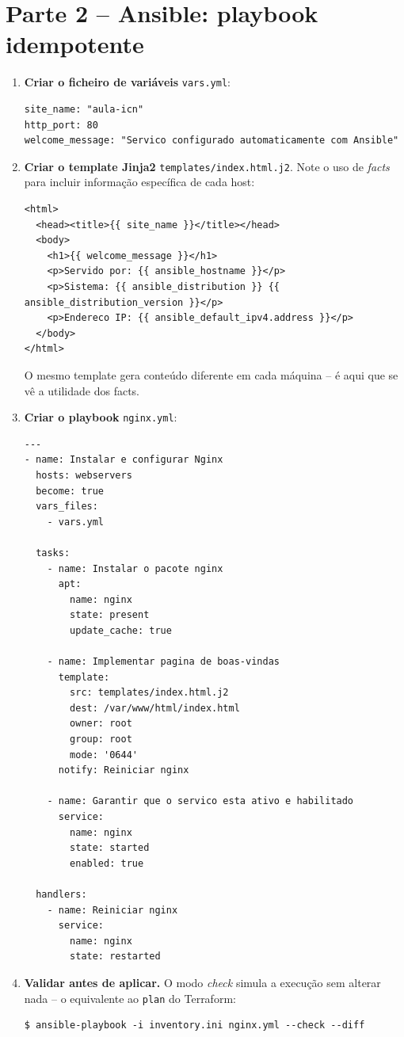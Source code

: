 \documentclass[11pt,a4paper]{article}
\begin{document}
\section{Parte 2 -- Ansible: playbook idempotente}
\begin{enumerate}[label=\arabic*.,resume]

  \item \textbf{Criar o ficheiro de variáveis} \texttt{vars.yml}:
\begin{lstlisting}
site_name: "aula-icn"
http_port: 80
welcome_message: "Servico configurado automaticamente com Ansible"
\end{lstlisting}

  \item \textbf{Criar o template Jinja2} \texttt{templates/index.html.j2}. Note o uso de \emph{facts} para incluir informação específica de cada host:
\begin{lstlisting}
<html>
  <head><title>{{ site_name }}</title></head>
  <body>
    <h1>{{ welcome_message }}</h1>
    <p>Servido por: {{ ansible_hostname }}</p>
    <p>Sistema: {{ ansible_distribution }} {{ ansible_distribution_version }}</p>
    <p>Endereco IP: {{ ansible_default_ipv4.address }}</p>
  </body>
</html>
\end{lstlisting}
  O mesmo template gera conteúdo diferente em cada máquina -- é aqui que se vê a utilidade dos facts.

  \item \textbf{Criar o playbook} \texttt{nginx.yml}:
\begin{lstlisting}
---
- name: Instalar e configurar Nginx
  hosts: webservers
  become: true
  vars_files:
    - vars.yml

  tasks:
    - name: Instalar o pacote nginx
      apt:
        name: nginx
        state: present
        update_cache: true

    - name: Implementar pagina de boas-vindas
      template:
        src: templates/index.html.j2
        dest: /var/www/html/index.html
        owner: root
        group: root
        mode: '0644'
      notify: Reiniciar nginx

    - name: Garantir que o servico esta ativo e habilitado
      service:
        name: nginx
        state: started
        enabled: true

  handlers:
    - name: Reiniciar nginx
      service:
        name: nginx
        state: restarted
\end{lstlisting}

  \item \textbf{Validar antes de aplicar.} O modo \emph{check} simula a execução sem alterar nada -- o equivalente ao \texttt{plan} do Terraform:
\begin{lstlisting}
$ ansible-playbook -i inventory.ini nginx.yml --check --diff
\end{lstlisting}


\end{enumerate}
\end{document}
